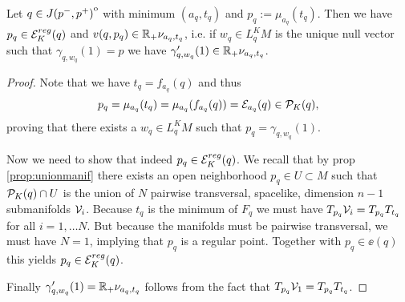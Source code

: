 \begin{lemma}\label{lem:amin}
    Let $q\in {\kern0ptJ(p^-,p^+)}^{\mathrm{o}}$ with minimum $(a_q,t_q)$ and $p_q:=\mu_{a_q}(t_q)$. Then we have $p_q\in {{\mathcal{E}}^{reg}_K}(q)$ and $v(q,p_q)\in \mathbb{R}_+\nu_{a_q,t_q}$, i.e. if $w_q\in L^K_qM$ is the unique null vector such that $\gamma_{q,w_q}(1)=p$ we have $\gamma'_{q,w_q}(1)\in \mathbb{R}_+\nu_{a_q,t_q}$.
\end{lemma}
\begin{proof}
    Note that we have $t_q = f_{a_q}(q)$ and thus 
    \[
        p_q =\mu_{a_q}(t_q) = \mu_{a_q}(f_{a_q}(q)) = {\mathcal{E}}_{a_q}(q)\in {{\mathcal{P}}_K(q)},
    \] proving that there exists a $w_q\in L^K_qM$ such that $p_q = \gamma_{q,w_q}(1)$. 

    Now we need to show that indeed $p_q\in {{\mathcal{E}}^{reg}_K}(q)$.
    We recall that by prop \ref{prop:unionmanif} there exists an open neighborhood $p_q\in U\subset M$ such that ${\mathcal{P}}_K(q)\cap U$ is the union of $N$ pairwise transversal, spacelike, dimension $n-1$ submanifolds ${\mathcal{V}}_i$. Because $t_q$ is the minimum of $F_q$ we must have $T_{p_q}{{\mathcal{V}}_i} = T_{p_q}{T_{t_q}}$ for all $i=1,\dots N$. But because the manifolds must be pairwise transversal, we must have $N=1$, implying that $p_q$ is a regular point. Together with $p_q\in \ee(q)$ this yields $p_q \in {{\mathcal{E}}^{reg}_K}(q)$.

    Finally $\gamma'_{q,w_q}(1)=\mathbb{R}_+\nu_{a_q,t_q}$ follows from the fact that $T_{p_q}{{\mathcal{V}}_1} = T_{p_q}{T_{t_q}}$.
\end{proof}

